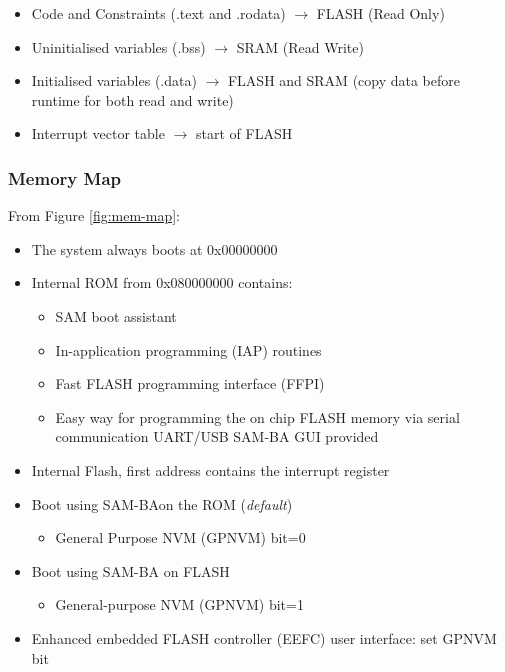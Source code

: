 \begin{itemize}
    \item Code and Constraints (.text and .rodata) $\to$ FLASH {\tiny (Read Only)}
    \item Uninitialised variables (.bss) $\to$ SRAM {\tiny (Read Write)}
    \item Initialised variables (.data) $\to$ FLASH and SRAM {\tiny (copy data before runtime for both read and write)}
    \item Interrupt vector table $\to$ start of FLASH
\end{itemize}

\subsubsection{Memory Map}



From Figure \ref{fig:mem-map}:

\begin{itemize}
    \item The system always boots at 0x00000000
    \item Internal ROM from 0x080000000 contains:
        \begin{itemize}
            \item SAM boot assistant
            \item In-application programming (IAP) routines
            \item Fast FLASH programming interface (FFPI)
            \item Easy way for programming  the on chip FLASH memory via serial communication UART/USB SAM-BA GUI provided
        \end{itemize}
    \item Internal Flash, first address contains the interrupt register
    \item Boot using SAM-BAon the ROM (\textit{default})
        \begin{itemize}
            \item General Purpose NVM (GPNVM) bit=0
        \end{itemize}
    \item Boot using SAM-BA on FLASH
        \begin{itemize}
            \item General-purpose NVM (GPNVM) bit=1
        \end{itemize}
    \item Enhanced embedded FLASH controller (EEFC) user interface: set GPNVM bit
\end{itemize}


